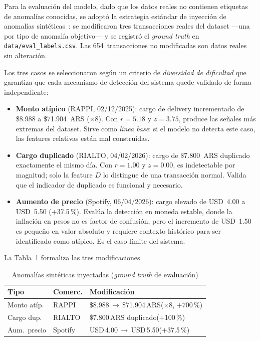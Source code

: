 \documentclass[conference]{IEEEtran}
\begin{document}
Para la evaluaci\'on del modelo, dado que los datos reales no contienen etiquetas
de anomal\'ias conocidas, se adopt\'o la estrategia est\'andar de inyecci\'on de
anomal\'ias sint\'eticas~\cite{dalpozzolo2018credit}: se modificaron tres transacciones
reales del dataset ---una por tipo de anomal\'ia objetivo--- y se registr\'o el
\emph{ground truth} en \texttt{data/eval\_labels.csv}. Las 654~transacciones no
modificadas son datos reales sin alteraci\'on.

Los tres casos se seleccionaron seg\'un un criterio de \emph{diversidad de dificultad}
que garantiza que cada mecanismo de detecci\'on del sistema quede validado de forma
independiente:

\begin{itemize}
  \item \textbf{Monto at\'ipico} (RAPPI, 02/12/2025): cargo de delivery incrementado
  de \$8.988 a \$71.904~ARS ($\times$8). Con $r = 5.18$ y $z = 3.75$, produce las
  se\~nales m\'as extremas del dataset. Sirve como \emph{l\'inea base}: si el modelo
  no detecta este caso, las features relativas est\'an mal construidas.

  \item \textbf{Cargo duplicado} (RIALTO, 04/02/2026): cargo de \$7.800~ARS
  duplicado exactamente el mismo d\'ia. Con $r = 1.00$ y $z = 0.00$, es
  indetectable por magnitud; solo la feature $D$ lo distingue de una transacci\'on
  normal. Valida que el indicador de duplicado es funcional y necesario.

  \item \textbf{Aumento de precio} (Spotify, 06/04/2026): cargo elevado de
  USD~4.00 a USD~5.50 ($+$37.5\,\%). Eval\'ua la detecci\'on en moneda estable,
  donde la inflaci\'on en pesos no es factor de confusi\'on, pero el incremento de
  USD~1.50 es peque\~no en valor absoluto y requiere contexto hist\'orico para ser
  identificado como at\'ipico. Es el caso l\'imite del sistema.
\end{itemize}

La Tabla~\ref{tab:ground-truth} formaliza las tres modificaciones.

\begin{table}[h]
\caption{Anomal\'ias sint\'eticas inyectadas (\emph{ground truth} de evaluaci\'on)}
\label{tab:ground-truth}
\centering
\begin{tabular}{p{1.6cm}p{1.0cm}p{4.1cm}}
\toprule
\textbf{Tipo} & \textbf{Comerc.} & \textbf{Modificaci\'on} \\
\midrule
Monto at\'ip. & RAPPI   & \$8.988\,$\to$\,\$71.904\,ARS\;($\times$8, $+$700\,\%) \\
Cargo dup.    & RIALTO  & \$7.800\,ARS duplicado\;($+$100\,\%) \\
Aum.\ precio  & Spotify & USD\,4.00\,$\to$\,USD\,5.50\;($+$37.5\,\%) \\
\bottomrule
\end{tabular}
\end{table}
\end{document}
